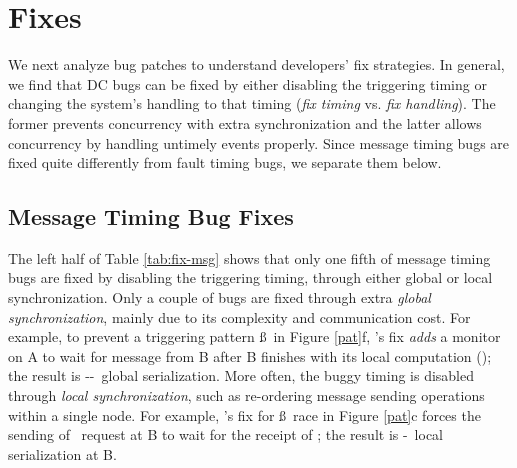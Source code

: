 \section{Fixes}
\label{sec-fix}

We next analyze bug patches to understand developers' fix strategies.
In general, we find that DC bugs can be fixed by either disabling the
triggering timing or changing the system's handling to that timing
({\em fix timing} vs. {\em fix handling}).  The former
prevents concurrency with extra synchronization and the latter allows
concurrency by handling untimely events properly.  Since message
timing bugs are fixed quite differently from fault timing bugs, we
separate them below.

\subsection{Message Timing Bug Fixes}
\label{fix-msg}




The left half of Table \ref{tab:fix-msg} shows that
only one fifth of message timing bugs are fixed by disabling the
triggering timing, through either
 global or local synchronization.
%
Only a couple of bugs are fixed through extra {\em global
  synchronization}, mainly due to its complexity and communication
cost.  For example, to prevent a triggering pattern \lbp\ss\mab\ in
Figure \ref{pat}f, 's fix {\em adds} a monitor on A
to wait for \mba{} message from B after B finishes
with its local computation (\lbp); the result is
\lbp-\mba-\mab\ global serialization.
%
More often, the buggy timing is disabled through {\em local
  synchronization}, such as re-ordering message sending operations
within a single node.  For example, 's fix for
\mab\ss\mbc\ race in Figure \ref{pat}c forces the sending of
\mbc\ request at B to wait for the receipt of \mab; the result is
\mab-\mbc\ local serialization at B.




\fi

